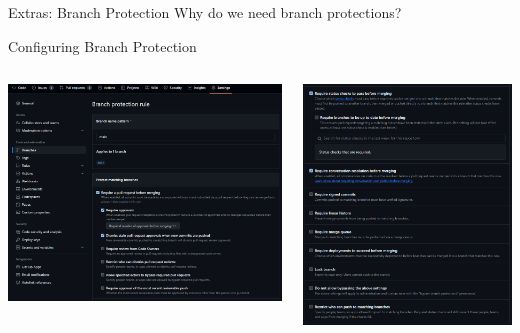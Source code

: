 \documentclass[aspectratio=169]{beamer}
\begin{document}
\begin{frame}{Extras: Branch Protection}
    Why do we need branch protections?
\end{frame}
\begin{frame}{Configuring Branch Protection}
    \begin{columns}
        \begin{column}{0.5\textwidth}
            \includegraphics[width=\textwidth,height=0.8\textheight,keepaspectratio]{branch_protection_1.png}
        \end{column}
        \begin{column}{0.5\textwidth}
            \includegraphics[width=\textwidth,height=0.8\textheight,keepaspectratio]{branch_protection_2.png}
        \end{column}
    \end{columns}
    \centering
\end{frame}
\end{document}
